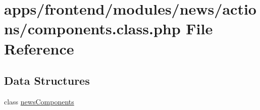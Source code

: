 \hypertarget{frontend_2modules_2news_2actions_2components_8class_8php}{\section{apps/frontend/modules/news/actions/components.class.\-php File Reference}
\label{frontend_2modules_2news_2actions_2components_8class_8php}
}
\subsection*{Data Structures}
\begin{DoxyCompactItemize}
\item 
class \hyperlink{classnews_components}{news\-Components}
\end{DoxyCompactItemize}
